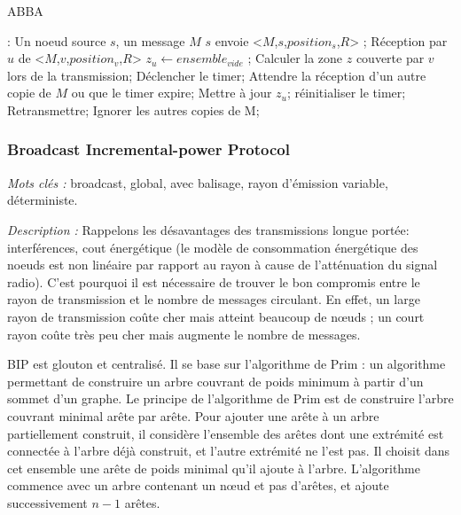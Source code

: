 \begin{algorithm}[H]
\caption{ABBA}
\label{ABBA}
\begin{algorithmic}
\REQUIRE:
Un noeud source $s$, un message $M$
\STATE $s$ envoie  <$M$,$s$,$position_s$,$R$> ;
\STATE Réception  par  $u$ de  <$M$,$v$,$position_v$,$R$>
\STATE $z_u\leftarrow ensemble_{vide}$ ;
\STATE Calculer la zone $z$ couverte par $v$ lors de la transmission;
\STATE Déclencher le timer;
\REPEAT
    \STATE Attendre la réception d'un autre copie de $M$ ou que le timer expire;
	\STATE Mettre à jour $z_u$;
	\STATE réinitialiser le timer;
    \ENDIF
{}
    \STATE Retransmettre;
\ENDIF
     \STATE Ignorer les autres copies de M;

\end{algorithmic}
\end{algorithm}


\subsubsection{Broadcast Incremental-power Protocol \cite{Wieselthier2000}}

\emph{Mots clés :} broadcast, global, avec balisage, rayon d'émission variable, déterministe.

\emph{Description :} Rappelons les désavantages des transmissions longue portée: interférences, cout énergétique (le modèle de consommation énergétique des noeuds est non linéaire par rapport au rayon à cause de l'atténuation du signal radio).
C'est pourquoi il est nécessaire de trouver le bon compromis entre le rayon de transmission et le nombre de messages circulant. En effet, un large rayon de transmission coûte cher mais atteint beaucoup de nœuds ; un court rayon coûte très peu cher mais augmente le nombre de messages. 

BIP est glouton et centralisé. Il se base sur l'algorithme de Prim \cite{Prim1957} : un algorithme permettant de construire un arbre couvrant de poids minimum à partir d'un sommet d'un graphe. Le principe de l'algorithme de Prim est de construire l'arbre couvrant minimal arête par arête. Pour ajouter une arête à un arbre partiellement construit, il considère l'ensemble des arêtes dont une extrémité est connectée à l'arbre déjà construit, et l'autre extrémité ne l'est pas. Il choisit dans cet ensemble une arête de poids minimal qu'il ajoute à l'arbre. L'algorithme commence avec un arbre contenant un nœud et pas d'arêtes, et ajoute successivement $n-1$ arêtes.


